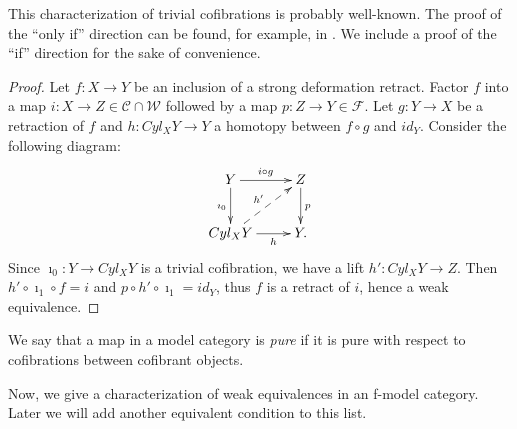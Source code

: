 \documentclass{amsart}
\theoremstyle{definition}
\newcommand{\we}{\mathcal{W}}
\newcommand{\fib}{\mathcal{F}}
\newcommand{\cof}{\mathcal{C}}
\begin{document}
This characterization of trivial cofibrations is probably well-known.
The proof of the ``only if'' direction can be found, for example, in \cite{hirschhorn}.
We include a proof of the ``if'' direction for the sake of convenience.

\begin{proof}
Let $f : X \to Y$ be an inclusion of a strong deformation retract.
Factor $f$ into a map $i : X \to Z \in \cof \cap \we$ followed by a map $p : Z \to Y \in \fib$.
Let $g : Y \to X$ be a retraction of $f$ and $h : Cyl_X Y \to Y$ a homotopy between $f \circ g$ and $id_Y$.
Consider the following diagram:
\[ \xymatrix{ Y \ar[r]^{i \circ g} \ar[d]_{\imath_0} & Z \ar[d]^p \\
              Cyl_X Y \ar[r]_-h \ar@{-->}[ur]^{h'}   & Y.
            } \]
Since $\imath_0 : Y \to Cyl_X Y$ is a trivial cofibration, we have a lift $h' : Cyl_X Y \to Z$.
Then $h' \circ \imath_1 \circ f = i$ and $p \circ h' \circ \imath_1 = id_Y$, thus $f$ is a retract of $i$, hence a weak equivalence.
\end{proof}

We say that a map in a model category is \emph{pure} if it is pure with respect to cofibrations between cofibrant objects.

Now, we give a characterization of weak equivalences in an f-model category.
Later we will add another equivalent condition to this list.
\end{document}
